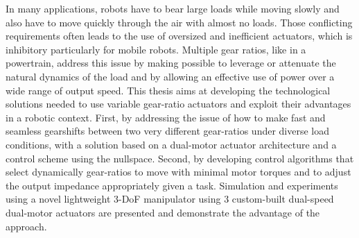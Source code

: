 In many applications, robots have to bear large loads while moving slowly and also have to move quickly through the air with almost no loads. Those conflicting requirements often leads to the use of oversized and inefficient actuators, which is inhibitory particularly for mobile robots. Multiple gear ratios, like in a powertrain, address this issue by making possible to leverage or attenuate the natural dynamics of the load and by allowing an effective use of power over a wide range of output speed. This thesis aims at developing the technological solutions needed to use variable gear-ratio actuators and exploit their advantages in a robotic context. First, by addressing the issue of how to make fast and seamless gearshifts between two very different gear-ratios under diverse load conditions, with a solution based on a dual-motor actuator architecture and a control scheme using the nullspace. Second, by developing control algorithms that select dynamically gear-ratios to move with minimal motor torques and to adjust the output impedance appropriately given a task. Simulation and experiments using a novel lightweight 3-DoF manipulator using 3 custom-built dual-speed dual-motor actuators are presented and demonstrate the advantage of the approach. 


